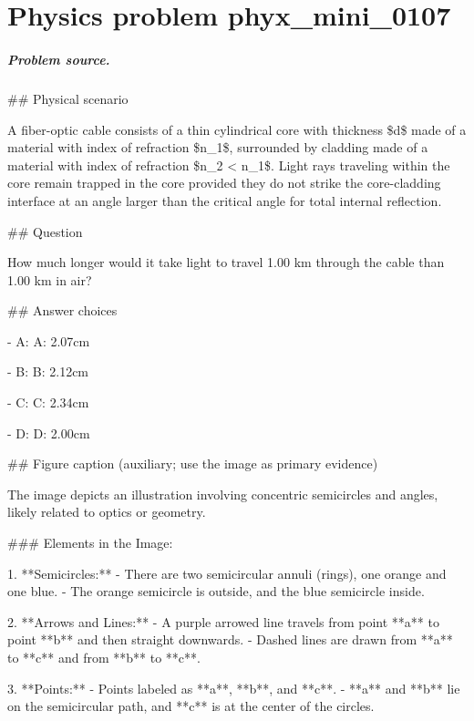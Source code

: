 
\chapter{Physics problem phyx\_mini\_0107}
\label{ch:PhyXMiniProblems_problem_phyx_mini_0107}

\paragraph{Problem source.}
\#\# Physical scenario

A fiber-optic cable consists of a thin cylindrical core with thickness \$d\$ made of a material with index of refraction \$n\_1\$, surrounded by cladding made of a material with index of refraction \$n\_2 < n\_1\$. Light rays traveling within the core remain trapped in the core provided they do not strike the core-cladding interface at an angle larger than the critical angle for total internal reflection.

\#\# Question

How much longer would it take light to travel 1.00 km through the cable than 1.00 km in air?

\#\# Answer choices

- A: A: 2.07cm

- B: B: 2.12cm

- C: C: 2.34cm

- D: D: 2.00cm

\#\# Figure caption (auxiliary; use the image as primary evidence)

The image depicts an illustration involving concentric semicircles and angles, likely related to optics or geometry.

\#\#\# Elements in the Image:

1. **Semicircles:**
   - There are two semicircular annuli (rings), one orange and one blue.
   - The orange semicircle is outside, and the blue semicircle inside.

2. **Arrows and Lines:**
   - A purple arrowed line travels from point **a** to point **b** and then straight downwards.
   - Dashed lines are drawn from **a** to **c** and from **b** to **c**.

3. **Points:**
   - Points labeled as **a**, **b**, and **c**.
   - **a** and **b** lie on the semicircular path, and **c** is at the center of the circles.

